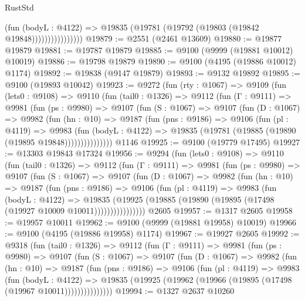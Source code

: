 \begin{lexlean}{RustStd}
\begin{coremodule}
                          (fun (bodyL : @4122) =>
                          @19835 (@19781 (@19792 (@19803 (@19842 @19848))))))))))))))))
@19879 := @2551 (@2461 @13609)
@19880 := @19877 @19879
@19881 := @19787 @19879
@19885 := @9100 (@9999 (@19881 @10012) @10019)
@19886 := @19798 @19879
@19890 := @9100 (@4195 (@19886 @10012) @1174)
@19892 := @19838 (@9147 @19879)
@19893 := @9132 @19892
@19895 := @9100 (@19893 @10042)
@19923 := @9272
    (fun (rty : @1067) =>
    @9109
      (fun (lets0 : @9108) =>
      @9110
        (fun (tail0 : @1326) =>
        @9112
          (fun (Γ : @9111) =>
          @9981
            (fun (ps : @9980) =>
            @9107
              (fun (S : @1067) =>
              @9107
                (fun (D : @1067) =>
                @9982
                  (fun (hn : @10) =>
                  @9187
                    (fun (pns : @9186) =>
                    @9106
                      (fun (pl : @4119) =>
                      @9983
                        (fun (bodyL : @4122) =>
                        @19835 (@19781 (@19885 (@19890 (@19895 @19848)))))))))))))))
    @1146
@19925 := @9100 (@19779 @17495)
@19927 := @13303 @19843 @17324
@19956 := @9294
    (fun (lets0 : @9108) =>
    @9110
      (fun (tail0 : @1326) =>
      @9112
        (fun (Γ : @9111) =>
        @9981
          (fun (ps : @9980) =>
          @9107
            (fun (S : @1067) =>
            @9107
              (fun (D : @1067) =>
              @9982
                (fun (hn : @10) =>
                @9187
                  (fun (pns : @9186) =>
                  @9106
                    (fun (pl : @4119) =>
                    @9983
                      (fun (bodyL : @4122) =>
                      @19835
                        (@19925
                          (@19885 (@19890 (@19895 (@17498 (@19927 @10009 @10011))))))))))))))))
    @2605
@19957 := @1317 @2605
@19958 := @19957 @10011
@19962 := @9100 (@9999 (@19881 @19958) @10019)
@19966 := @9100 (@4195 (@19886 @19958) @1174)
@19967 := @19927 @2605
@19992 := @9318
    (fun (tail0 : @1326) =>
    @9112
      (fun (Γ : @9111) =>
      @9981
        (fun (ps : @9980) =>
        @9107
          (fun (S : @1067) =>
          @9107
            (fun (D : @1067) =>
            @9982
              (fun (hn : @10) =>
              @9187
                (fun (pns : @9186) =>
                @9106
                  (fun (pl : @4119) =>
                  @9983
                    (fun (bodyL : @4122) =>
                    @19835 (@19925 (@19962 (@19966 (@19895 (@17498 (@19967 @10011)))))))))))))))
@19994 := @1327 @2637 @10260

\end{coremodule}
\end{lexlean}

